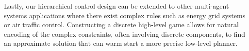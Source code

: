 Lastly, our hierarchical control design can be extended to other multi-agent systems applications where there exist complex rules such as energy grid systems or air traffic control. Constructing a discrete high-level game allows for natural encoding of the complex constraints, often involving discrete components, to find an approximate solution that can warm start a more precise low-level planner.